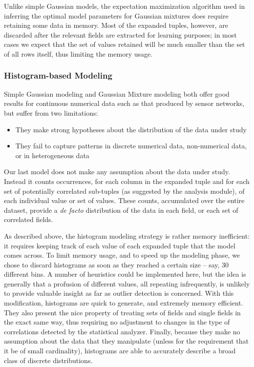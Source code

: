 Unlike simple Gaussian models, the expectation maximization algorithm used in inferring the optimal model parameters for Gaussian mixtures does require retaining some data in memory. Most of the expanded tuples, however, are discarded after the relevant fields are extracted for learning purposes; in most cases we expect that the set of values retained will be much smaller than the set of all rows itself, thus limiting the memory usage.

\subsubsection{Histogram-based Modeling}
Simple Gaussian modeling and Gaussian Mixture modeling both offer good results for continuous numerical data such as that produced by sensor networks, but suffer from two limitations:

\begin{itemize}
\item They make strong hypotheses about the distribution of the data under study
\item They fail to capture patterns in discrete numerical data, non-numerical data, or in heterogeneous data
\end{itemize}

Our last model does not make any assumption about the data under study. Instead it counts occurrences, for each column in the expanded tuple and for each set of potentially correlated sub-tuples (as suggested by the analysis module), of each individual value or set of values. These counts, accumulated over the entire dataset, provide a \emph{de facto} distribution of the data in each field, or each set of correlated fields. 

As described above, the histogram modeling strategy is rather memory inefficient: it requires keeping track of each value of each expanded tuple that the model comes across. To limit memory usage, and to speed up the modeling phase, we chose to discard histograms as soon as they reached a certain size -- say, 30 different bins. A number of heuristics could be implemented here, but the idea is generally that a profusion of different values, all repeating infrequently, is unlikely to provide valuable insight as far as outlier detection is concerned. With this modification, histograms are quick to generate, and extremely memory efficient. They also present the nice property of treating sets of fields and single fields in the exact same way, thus requiring no adjustment to changes in the type of correlations detected by the statistical analyzer. Finally, because they make no assumption about the data that they manipulate (unless for the requirement that it be of small cardinality), histograms are able to accurately describe a broad class of discrete distributions.

